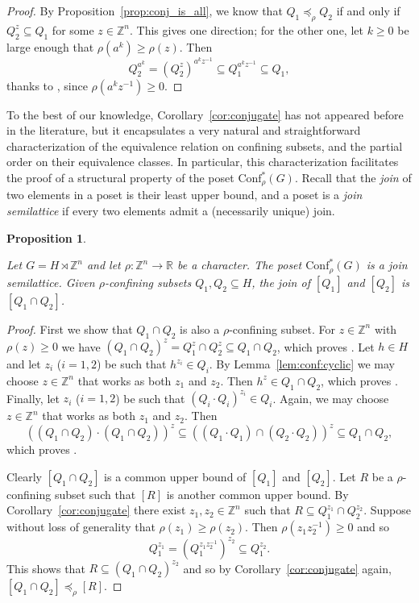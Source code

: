 \documentclass[10pt,a4paper]{article}
\newtheorem{prop}[cdrthm]{Proposition}
\theoremstyle{definition}
\theoremstyle{remark}
\newcommand{\Z}{\mathbb{Z}}
\newcommand{\R}{\mathbb{R}}
\newcommand{\Conf}{\mathrm{Conf}}
\theoremstyle{plain}
\begin{document}
\begin{proof}
By Proposition~\ref{prop:conj_is_all}, we know that $Q_1 \preceq_\rho Q_2$ if and only if $Q_2^z \subseteq Q_1$ for some $z \in \Z^n$. This gives one direction; for the other one, let $k \geq 0$ be large enough that $\rho(a^k) \geq \rho(z)$. Then
\[Q_2^{a^k} = (Q_2^z)^{a^k z^{-1}} \subseteq Q_1^{a^k z^{-1}} \subseteq Q_1,\]
thanks to \StayInConf, since $\rho(a^k z^{-1}) \geq 0$.
\end{proof}

To the best of our knowledge, Corollary~\ref{cor:conjugate} has not appeared before in the literature, but it encapsulates a very natural and straightforward characterization of the equivalence relation on confining subsets, and the partial order on their equivalence classes. In particular, this characterization facilitates the proof of a structural property of the poset $\Conf^\ast_\rho(G)$. Recall that the \emph{join} of two elements in a poset is their least upper bound, and a poset is a \emph{join semilattice} if every two elements admit a (necessarily unique) join.

\begin{prop}
\label{prop:join}

Let $G=H\rtimes \Z^n$ and let $\rho\colon \Z^n \to\R$ be a character. The poset $\Conf^\ast_\rho(G)$ is a join semilattice. Given $\rho$-confining subsets $Q_1, Q_2 \subseteq H$, the join of $[Q_1]$ and $[Q_2]$ is $[Q_1 \cap Q_2]$.
\end{prop}

\begin{proof}
First we show that $Q_1 \cap Q_2$ is also a $\rho$-confining subset. For $z \in \Z^n$ with $\rho(z) \geq 0$ we have $(Q_1 \cap Q_2)^z = Q_1^z \cap Q_2^z \subseteq Q_1 \cap Q_2$, which proves \StayInConf.
Let $h \in H$ and let $z_i$ ($i=1,2$) be such that $h^{z_i} \in Q_i$. By Lemma~\ref{lem:conf:cyclic} we may choose $z \in \Z^n$ that works as both $z_1$ and $z_2$. Then $h^z \in Q_1 \cap Q_2$, which proves \GetInConf.
Finally, let $z_i$ ($i=1,2$) be such that $(Q_i \cdot Q_i)^{z_i} \in Q_i$. Again, we may choose $z \in \Z^n$ that works as both $z_1$ and $z_2$. Then
\[
((Q_1 \cap Q_2) \cdot (Q_1 \cap Q_2))^{z} \subseteq ((Q_1 \cdot Q_1) \cap (Q_2 \cdot Q_2))^{z} \subseteq Q_1 \cap Q_2,
\]
which proves \ProdConf.

Clearly $[Q_1 \cap Q_2]$ is a common upper bound of $[Q_1]$ and $[Q_2]$. Let $R$ be a $\rho$-confining subset such that $[R]$ is another common upper bound. By Corollary~\ref{cor:conjugate} there exist $z_1, z_2 \in \Z^n$ such that $R \subseteq Q_1^{z_1} \cap Q_2^{z_2}$. Suppose without loss of generality that $\rho(z_1) \geq \rho(z_2)$. Then $\rho(z_1 z_2^{-1}) \geq 0$ and so \[Q_1^{z_1} = (Q_1^{z_1 z_2^{-1}})^{z_2} \subseteq Q_1^{z_2}.\]
This shows that $R \subseteq (Q_1 \cap Q_2)^{z_2}$ and so by Corollary~\ref{cor:conjugate} again, $[Q_1 \cap Q_2] \preccurlyeq_\rho [R]$.
\end{proof}
\end{document}

